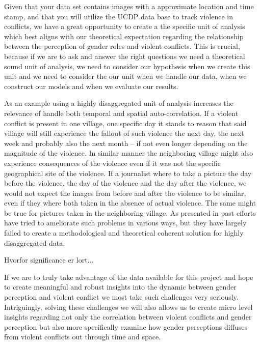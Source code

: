 \documentclass[a4paper]{article}
\begin{document}
Given that your data set contains images with a approximate location and time stamp, and that you will utilize the UCDP data base to track violence in conflicts, we have a great opportunity to create a the specific unit of analysis which best aligns with our theoretical expectation regarding the relationship between the perception of gender roles and violent conflicts. This is crucial, because if we are to ask and answer the right questions we need a theoretical sound unit of analysis, we need to consider our hypothesis when we create this unit and we need to consider the our unit when we handle our data, when we construct our models and when we evaluate our results.\par 

As an example using a highly disaggregated unit of analysis increases the relevance of handle both temporal and spatial auto-correlation. If a violent conflict is present in one village, one specific day it stands to reason that said village will still experience the fallout of such violence the next day, the next week and probably also the next month -- if not even longer depending on the magnitude of the violence. In similar manner the neighboring village might also experience consequences of the violence even if it was not the specific geographical site of the violence. If a journalist where to take a picture the day before the violence, the day of the violence and the day after the violence, we would not expect the images from before and after the violence to be similar, even if they where both taken in the absence of actual violence. The same might be true for pictures taken in the neighboring village. As presented in \cite{SPECIALE} past efforts have tried to ameliorate such problems in various ways, but they have largely failed to create a methodological and theoretical coherent solution for highly disaggregated data.\par 


Hvorfor significance er lort...

If we are to truly take advantage of the data available for this project and hope to create meaningful and robust insights into the dynamic between gender perception and violent conflict we most take such challenges very seriously. Intriguingly, solving these challenges we will also allows us to create micro level insights regarding not only the correlation between violent conflicts and gender perception but also more specifically examine how gender perceptions diffuses from violent conflicts out through time and space.\par
\end{document}

